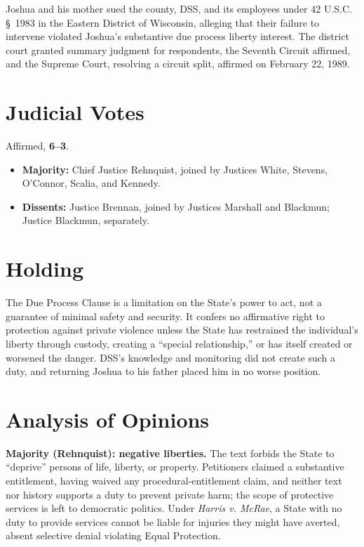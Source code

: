 \documentclass[12pt]{article}
\begin{document}
Joshua and his mother sued the county, DSS, and its employees under 42 U.S.C. \S~1983 in the Eastern District of Wisconsin, alleging that their failure to intervene violated Joshua's substantive due process liberty interest. The district court granted summary judgment for respondents, the Seventh Circuit affirmed, and the Supreme Court, resolving a circuit split, affirmed on February 22, 1989.

\section{Judicial Votes}

Affirmed, \textbf{6--3}.
\begin{itemize}
\item \textbf{Majority:} Chief Justice Rehnquist, joined by Justices White, Stevens, O'Connor, Scalia, and Kennedy.
\item \textbf{Dissents:} Justice Brennan, joined by Justices Marshall and Blackmun; Justice Blackmun, separately.
\end{itemize}

\section{Holding}

The Due Process Clause is a limitation on the State's power to act, not a guarantee of minimal safety and security. It confers no affirmative right to protection against private violence unless the State has restrained the individual's liberty through custody, creating a ``special relationship,'' or has itself created or worsened the danger. DSS's knowledge and monitoring did not create such a duty, and returning Joshua to his father placed him in no worse position.

\section{Analysis of Opinions}

\textbf{Majority (Rehnquist): negative liberties.} The text forbids the State to ``deprive'' persons of life, liberty, or property. Petitioners claimed a substantive entitlement, having waived any procedural-entitlement claim, and neither text nor history supports a duty to prevent private harm; the scope of protective services is left to democratic politics. Under \textit{Harris v. McRae}, a State with no duty to provide services cannot be liable for injuries they might have averted, absent selective denial violating Equal Protection.
\end{document}
